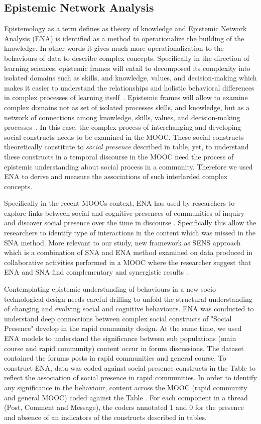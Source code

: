 \documentclass[manuscript,screen,review]{acmart}
\begin{document}
\subsection{Epistemic Network Analysis}
Epistemology as a term defines as theory of knowledge and Epistemic Network Analysis (ENA) is identified as a method to operationalize the building of the knowledge. In other words it gives much more operationalization to the behaviours of data to describe complex concepts. Specifically in the direction of learning sciences, epistemic frames will entail to decomposed its complexity into isolated domains such as skills, and knowledge, values, and decision-making which makes it easier to understand the relationships and holistic behavioral differences in complex processes of learning itself~\cite{shaffer2017quantitative}. Epistemic frames will allow to examine complex domains not as set of isolated processes skills, and knowledge, but as a network of
connections among knowledge, skills, values, and decision-making processes~\cite{shaffer2009epistemic,rupp2010evidence}. In this case, the complex process of interchanging and developing social constructs needs to be examined in the MOOC. These social constructs theoretically constitute to \textit{social presence} described in table, yet, to understand these constructs in a temporal discourse in the MOOC need the process of epistemic understanding about social process in a community. Therefore we used ENA to derive and measure the associations of such interlarded complex concepts.

Specifically in the recent MOOCs context, ENA has used by researchers to explore links between social and cognitive presences of communities of inquiry and discover social presence over the time in discourse \cite{rolim2019network}. Specifically this allow the researchers to identify type of interactions in the content which was missed in the SNA method. More relevant to our study,  new framework as SENS approach which is a combination of SNA and ENA method examined on data produced in collaborative activities performed in a MOOC where the researcher suggest that ENA and SNA find complementary and synergistic results \cite{gavsevic2019sens}. 

Contemplating epistemic understanding of behaviours in a new socio-technological design needs careful drilling to unfold the structural understanding of changing and evolving social and cognitive behaviours. ENA was conducted to understand deep connections between complex  social constructs of "Social Presence" develop in the rapid community design. At the same time, we used ENA models to understand the significance between sub populations (main course and rapid community) content occur in forum discussions. The dataset contained the forums posts in rapid communities and general course. To construct ENA, data was coded  against social presence constructs in the Table to reflect the association of social presence in rapid communities. In order to identify any significance in the behaviour, content across the MOOC (rapid community and general MOOC) coded against the Table . For each component in a thread (Post, Comment and Message), the coders annotated 1 and 0 for the presence and absence of an indicators of the constructs described in tables.  
\end{document}

